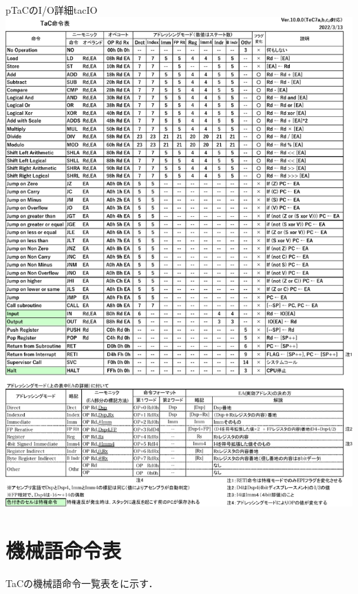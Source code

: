 \begin{myfig}{p}{TaCのI/O詳細}{tacIO}
  \includegraphics[scale=0.7,page=5]{Fig/TaCInst-crop.pdf}
\end{myfig}

\section{機械語命令表}
TaCの機械語命令一覧表をに示す．

